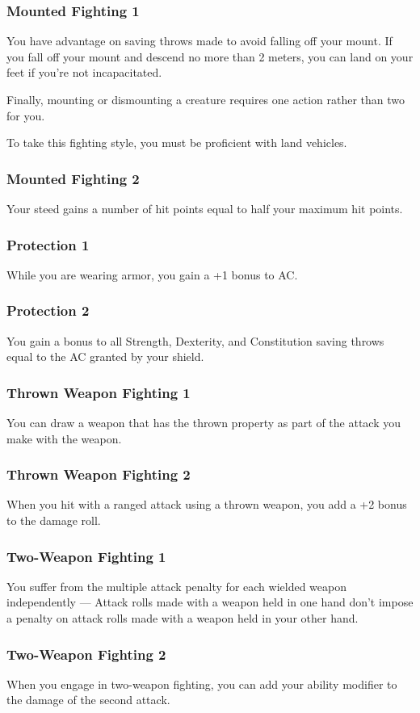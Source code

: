     \subsubsection{Mounted Fighting 1}
        You have advantage on saving throws made to avoid falling off your mount.
        If you fall off your mount and descend no more than 2 meters, you can land on your feet if you're not incapacitated.

        Finally, mounting or dismounting a creature requires one action rather than two for you.

        To take this fighting style, you must be proficient with land vehicles.
    \subsubsection{Mounted Fighting 2}
        Your steed gains a number of hit points equal to half your maximum hit points.
    \subsubsection{Protection 1}
        While you are wearing armor, you gain a +1 bonus to AC.
    \subsubsection{Protection 2}
        You gain a bonus to all Strength, Dexterity, and Constitution saving throws equal to the AC granted by your shield.
    \subsubsection{Thrown Weapon Fighting 1}
        You can draw a weapon that has the thrown property as part of the attack you make with the weapon.
    \subsubsection{Thrown Weapon Fighting 2}
        When you hit with a ranged attack using a thrown weapon, you add a +2 bonus to the damage roll.
    \subsubsection{Two-Weapon Fighting 1}
        You suffer from the multiple attack penalty for each wielded weapon independently --- Attack rolls made with a weapon held in one hand don't impose a penalty on attack rolls made with a weapon held in your other hand.
    \subsubsection{Two-Weapon Fighting 2}
        When you engage in two-weapon fighting, you can add your ability modifier to the damage of the second attack.
